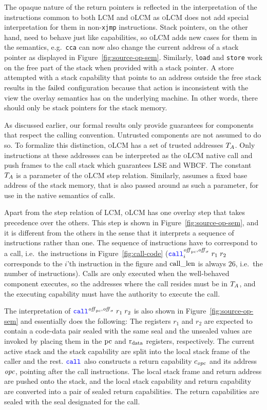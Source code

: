 \documentclass[acmsmall,screen]{acmart}\settopmatter{}
\newcommand{\trgcm}{\textsc{LCM}}
\newcommand{\srccm}{\textsc{oLCM}}
\begin{document}
The opaque nature of the return pointers is reflected in the interpretation of the instructions common to both \trgcm{} and \srccm{} as \srccm{} does not add special interpretation for them in non-\texttt{xjmp} instructions.
Stack pointers, on the other hand, need to behave just like capabilities, so \srccm{} adds new cases for them in the semantics, e.g.\ \texttt{cca} can now also change the current address of a stack pointer as displayed in Figure~\ref{fig:source-op-sem}.
Similarly, \texttt{load} and \texttt{store} work on the free part of the stack when provided with a stack pointer.
A store attempted with a stack capability that points to an address outside the free stack results in the $\mathrm{failed}$ configuration because that action is inconsistent with the view the overlay semantics has on the underlying machine.
In other words, there should only be stack pointers for the stack memory.

As discussed earlier, our formal results only provide guarantees for components that respect the calling convention.
Untrusted components are not assumed to do so.
To formalize this distinction, \srccm{} has a set of trusted addresses $T_{A}$.
Only instructions at these addresses can be interpreted as the \srccm{} native call and push frames to the call stack which guarantees LSE and WBCF.
The constant $T_{A}$ is a parameter of the \srccm{} step relation.
Similarly, \stktokens{} assumes a fixed base address of the stack memory, that is also passed around as such a parameter, for use in the native semantics of calls.

Apart from the step relation of \trgcm{}, \srccm{} has one overlay step that takes precedence over the others.
This step is shown in Figure~\ref{fig:source-op-sem}, and it is different from the others in the sense that it interprets a sequence of instructions rather than one.
The sequence of instructions have to correspond to a call, i.e.\ the
instructions in Figure~\ref{fig:call-code} ({\footnotesize  $\scall[i]{\offpc,\offsigma}{r_1}{r_2}$} corresponds to the $i$'th instruction in the figure and $\mathrm{call\_len}$ is always $26$, i.e.\ the number of instructions).
Calls are only executed when the well-behaved component executes, so the addresses where the call resides must be in $T_{A}$, and the executing capability must have the authority to execute the call.

The interpretation of $\scall{\offpc,\offsigma}{r_1}{r_2}$ is also shown in Figure~\ref{fig:source-op-sem} and essentially does the following:
The registers $r_1$ and $r_2$ are expected to contain a code-data pair sealed with the same seal and the unsealed values are invoked by placing them in the $\mathrm{pc}$ and $\mathrm{r}_\mathrm{data}$ registers, respectively.
The current active stack and the stack capability are split into the local stack frame of the caller and the rest.
$\scall{}{}{}$ also constructs a return capability $c_{\mathit{opc}}$ and its address $\mathit{opc}$, pointing after the call instructions.
The local stack frame and return address are pushed onto the stack, and the local stack capability and return capability are converted into a pair of sealed return capabilities.
The return capabilities are sealed with the seal designated for the call.
\end{document}
